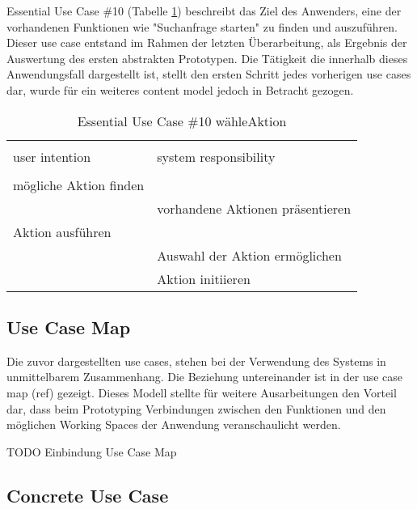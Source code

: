 Essential Use Case \#10 (Tabelle \ref{tab:aktionen}) beschreibt das Ziel des Anwenders, eine der vorhandenen Funktionen wie  "Suchanfrage starten" zu finden und auszuführen. Dieser use case entstand im Rahmen der letzten Überarbeitung, als Ergebnis der Auswertung des ersten abstrakten Prototypen. Die Tätigkeit die innerhalb dieses Anwendungsfall dargestellt ist, stellt den ersten Schritt jedes vorherigen use cases dar, wurde für ein weiteres content model jedoch in Betracht gezogen.

\begin{table}[H]
\caption{Essential Use Case \#10 wähleAktion }
\centering
\begin{tabular}{l l}
\\ [-0.5ex]

\hline\hline
\\ [-0.5ex]
user intention & system responsibility
\\ [1.5ex]
\hline
\\ [-0.5ex]
mögliche Aktion finden        &                                \\[1ex]
                        & vorhandene Aktionen präsentieren        \\[1ex]
Aktion ausführen           &                                \\[1ex] 
                        & Auswahl der Aktion ermöglichen       \\[1ex]
                        & Aktion initiieren                    \\[1ex]
\hline
\end{tabular}
\label{tab:aktionen}
\end{table}

\newpage
\subsection{Use Case Map}
Die zuvor dargestellten use cases, stehen bei der Verwendung des Systems in unmittelbarem Zusammenhang. Die Beziehung untereinander ist in der use case map (ref) gezeigt. Dieses Modell stellte für weitere Ausarbeitungen den Vorteil dar, dass beim Prototyping Verbindungen zwischen den Funktionen und den möglichen Working Spaces der Anwendung veranschaulicht werden.

TODO Einbindung Use Case Map

\newpage
\subsection{Concrete Use Case}

